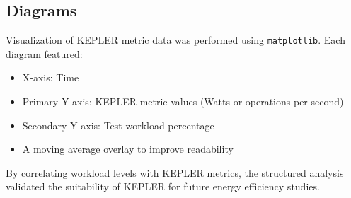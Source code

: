 \subsection{Diagrams}
Visualization of KEPLER metric data was performed using \texttt{matplotlib}. Each diagram featured:
\begin{itemize}
\item X-axis: Time
\item Primary Y-axis: KEPLER metric values (Watts or operations per second)
\item Secondary Y-axis: Test workload percentage
\item A moving average overlay to improve readability
\end{itemize}
By correlating workload levels with KEPLER metrics, the structured analysis validated the suitability of KEPLER for future energy efficiency studies.


